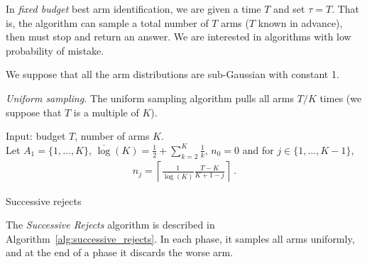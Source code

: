 In \emph{fixed budget} best arm identification, we are given a time $T$ and set $\tau = T$. That is, the algorithm can sample a total number of $T$ arms ($T$ known in advance), then must stop and return an answer. We are interested in algorithms with low probability of mistake.

We suppose that all the arm distributions are sub-Gaussian with constant 1.

\begin{questions}


\question \emph{Uniform sampling.} The uniform sampling algorithm pulls all arms $T/K$ times (we suppose that $T$ is a multiple of $K$).

\begin{algorithm}[!h]
    \SetAlgoLined
    Input: budget $T$, number of arms $K$.\\
    Let $A_1 = \{1, \ldots, K\}$, $\overline{\log}(K) = \frac{1}{2} + \sum_{k=2}^K \frac{1}{k}$, $n_0 = 0$ and for $j \in \{1, \ldots, K-1\}$,
    \begin{align*}
    n_j = \left\lceil \frac{1}{\overline{\log}(K)}\frac{T-K}{K+1-j}\right\rceil \: .
    \end{align*}
    \caption{Successive rejects}
    \label{alg:successive_rejects}
\end{algorithm}

\question The \emph{Successive Rejects} algorithm is described in Algorithm~\ref{alg:successive_rejects}. In each phase, it samples all arms uniformly, and at the end of a phase it discards the worse arm.
\begin{parts}

\end{parts}
\end{questions}
